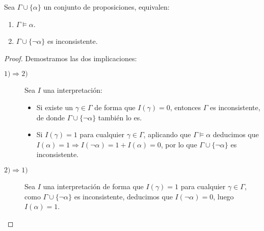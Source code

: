 \begin{prop}
    Sea $\Gamma\cup\{\alpha\}$ un conjunto de proposiciones, equivalen:
    \begin{enumerate}
        \item $\Gamma\vDash \alpha$.
        \item $\Gamma\cup\{\lnot\alpha\}$ es inconsistente.
    \end{enumerate}
    \begin{proof}
        Demostramos las dos implicaciones:
        \begin{description}
            \item [$1) \Longrightarrow 2)$] Sea $I$ una interpretación:
                \begin{itemize}
                    \item Si existe un $\gamma\in \Gamma$ de forma que $I(\gamma)=0$, entonces $\Gamma$ es inconsistente, de donde $\Gamma\cup\{\lnot\alpha\}$ también lo es.
                    \item Si $I(\gamma)=1$ para cualquier $\gamma\in \Gamma$, aplicando que $\Gamma\vDash \alpha$ deducimos que\newline $I(\alpha)=1 \Longrightarrow I(\lnot\alpha) = 1 + I(\alpha) = 0$, por lo que $\Gamma\cup\{\lnot\alpha\}$ es inconsistente.
                \end{itemize}
            \item [$2) \Longrightarrow 1)$] Sea $I$ una interpretación de forma que $I(\gamma)=1$ para cualquier $\gamma\in \Gamma$, como $\Gamma\cup\{\lnot\alpha\}$ es inconsistente, deducimos que $I(\lnot\alpha) = 0$, luego $I(\alpha) = 1$.
        \qedhere
        \end{description}
    \end{proof}
\end{prop}

